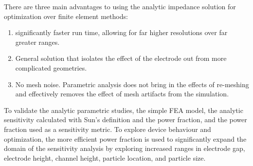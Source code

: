 \par There are three main advantages to using the analytic impedance solution for optimization over finite element methods:

\begin{enumerate}
	\item significantly faster run time, allowing for far higher resolutions over far greater ranges.
	\item General solution that isolates the effect of the electrode out from more complicated geometries.
	\item No mesh noise. Parametric analysis does not bring in the effects of re-meshing and effectively removes the effect of mesh artifacts from the simulation.
\end{enumerate}

\par To validate the analytic parametric studies, the simple FEA model, the analytic sensitivity calculated with Sun's definition and the power fraction, and the power fraction used as a sensitivity metric. To explore device behaviour and optimization, the more efficient power fraction is used to significantly expand the domain of the sensitivity analysis by exploring increased ranges in electrode gap, electrode height, channel height, particle location, and particle size. 


